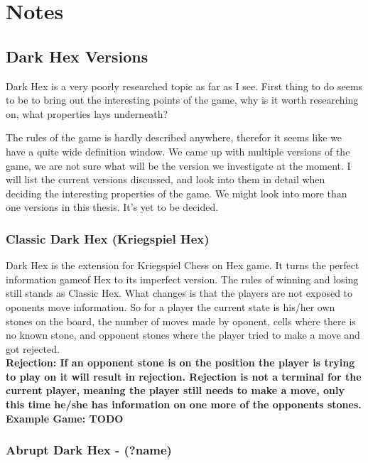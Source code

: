 \section{Notes} \label{section:notes}

\subsection{Dark Hex Versions}

Dark Hex is a very poorly researched topic as far as I see. First thing to do seems to be to bring out the interesting points of the game, why is it worth researching on, what properties lays underneath?

The rules of the game is hardly described anywhere, therefor it seems like we have a quite wide definition window. We came up with multiple versions of the game, we are not sure what will be the version we investigate at the moment.
I will list the current versions discussed, and look into them in detail when deciding the interesting properties of the game. We might look into more than one versions in this thesis. It's yet to be decided.

\subsubsection{Classic Dark Hex (Kriegspiel Hex)}
Dark Hex is the extension for Kriegspiel Chess on Hex game. It turns the perfect information gameof Hex to its imperfect version. The rules of winning and losing still stands as Classic Hex. What changes is that the players are not exposed to oponents move information. So for a player the current state is his/her own stones on the board, the number of moves made by oponent, cells where there is no known stone, and opponent stones where the player tried to make a move and got rejected.\\

\bf{Rejection:} If an opponent stone is on the position the player is trying to play on it will result in rejection. Rejection is not a terminal for the current player, meaning the player still needs to make a move, only this time he/she has information on one more of the opponents stones.\\

{\bf Example Game:}
TODO

\subsubsection{Abrupt Dark Hex - (?name)}

